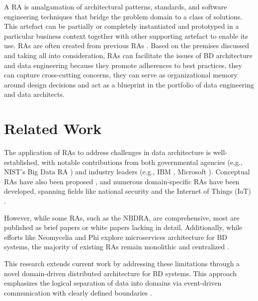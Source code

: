 \documentclass[review]{elsarticle}
\begin{document}

A RA is amalgamation of architectural patterns, standards, and software engineering techniques that bridge the problem domain to a class of solutions. This artefact can be partially or completely instantiated and prototyped in a particular business context together with other supporting artefact to enable its use. RAs are often created from previous RAs \cite{AtaeiACIS}. Based on the premises discussed and taking all into consideration, RAs can facilitate the issues of BD architecture and data engineering because they promote adherences to best practices, they can capture cross-cutting concerns, they can serve as organizational memory around design decisions and act as a blueprint in the portfolio of data engineering and data architects. 


\section{Related Work}

The application of RAs to address challenges in data architecture is well-established, with notable contributions from both governmental agencies (e.g., NIST's Big Data RA \cite{Chang}) and industry leaders (e.g., IBM \cite{quintero2019ibm}, Microsoft \cite{levin2013big}).  Conceptual RAs have also been proposed \cite{Maier,suthakar2017scalable,framework2015draft}, and numerous domain-specific RAs have been developed, spanning fields like national security \cite{Klein} and the Internet of Things (IoT) \cite{weyrich2015reference}.

However, while some RAs, such as the NBDRA, are comprehensive, most are published as brief papers or white papers lacking in detail. Additionally, while efforts like Neomycelia \cite{AtaeiApsec} and Phi \cite{maamouri2021phi} explore microservices architecture for BD systems, the majority of existing RAs remain monolithic and centralized \cite{ataei2022state}.

This research extends current work by addressing these limitations through a novel domain-driven distributed architecture for BD systems. This approach emphasizes the logical separation of data into domains via event-driven communication with clearly defined boundaries \cite{AtaeiApsec}.
\end{document}
